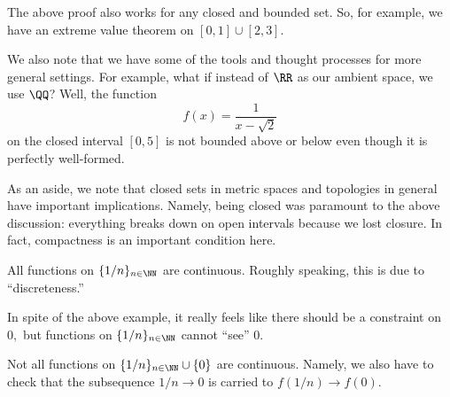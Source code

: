 \begin{remark}
	The above proof also works for any closed and bounded set. So, for example, we have an extreme value theorem on $[0,1]\cup[2,3].$
\end{remark}
We also note that we have some of the tools and thought processes for more general settings. For example, what if instead of $\RR$ as our ambient space, we use $\QQ$? Well, the function
\[f(x)=\frac1{x-\sqrt2}\]
on the closed interval $[0,5]$ is not bounded above or below even though it is perfectly well-formed.

As an aside, we note that closed sets in metric spaces and topologies in general have important implications. Namely, being closed was paramount to the above discussion: everything breaks down on open intervals because we lost closure. In fact, compactness is an important condition here.
\begin{example}
	All functions on $\{1/n\}_{n\in\NN}$ are continuous. Roughly speaking, this is due to ``discreteness.''
\end{example}
In spite of the above example, it really feels like there should be a constraint on $0,$ but functions on $\{1/n\}_{n\in\NN}$ cannot ``see'' $0.$
\begin{example}
	Not all functions on $\{1/n\}_{n\in\NN}\cup\{0\}$ are continuous. Namely, we also have to check that the subsequence $1/n\to0$ is carried to $f(1/n)\to f(0).$
\end{example}

